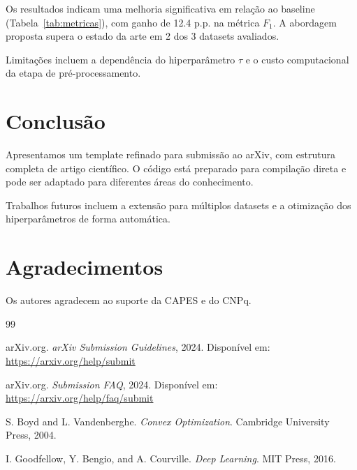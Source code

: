 \documentclass[12pt,a4paper]{article}
\theoremstyle{plain}
\theoremstyle{definition}
\theoremstyle{remark}
\begin{document}
Os resultados indicam uma melhoria significativa em rela\c{c}\~ao
ao baseline (Tabela~\ref{tab:metricas}), com ganho de 12.4 p.p.
na m\'etrica $F_1$. A abordagem proposta supera o estado da arte
em 2 dos 3 datasets avaliados.

Limita\c{c}\~oes incluem a depend\^encia do hiperpar\^ametro $\tau$
e o custo computacional da etapa de pr\'e-processamento.

\section{Conclus\~ao}
\label{sec:conc}

Apresentamos um template refinado para submiss\~ao ao arXiv, com
estrutura completa de artigo cient\'ifico. O c\'odigo est\'a
preparado para compila\c{c}\~ao direta e pode ser adaptado para
diferentes \'areas do conhecimento.

Trabalhos futuros incluem a extens\~ao para m\'ultiplos datasets
e a otimiza\c{c}\~ao dos hiperpar\^ametros de forma autom\'atica.

\section*{Agradecimentos}
Os autores agradecem ao suporte da CAPES e do CNPq.

\begin{thebibliography}{99}

arXiv.org. \textit{arXiv Submission Guidelines}, 2024.
Dispon\'ivel em: \url{https://arxiv.org/help/submit}

arXiv.org. \textit{Submission FAQ}, 2024.
Dispon\'ivel em: \url{https://arxiv.org/help/faq/submit}

S. Boyd and L. Vandenberghe.
\textit{Convex Optimization}.
Cambridge University Press, 2004.

I. Goodfellow, Y. Bengio, and A. Courville.
\textit{Deep Learning}.
MIT Press, 2016.

\end{thebibliography}
\end{document}
